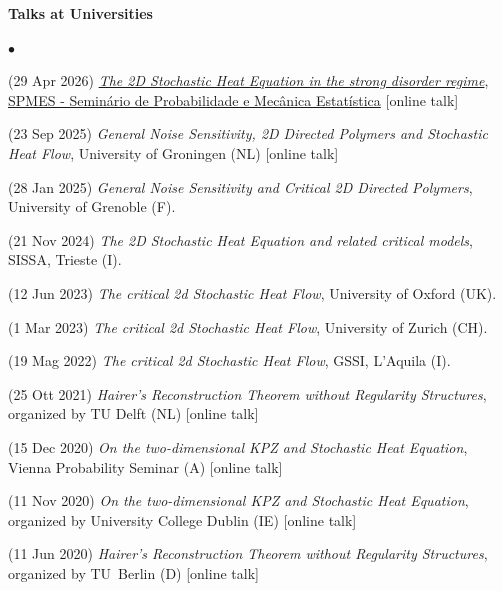 \documentclass[a4paper,11pt,oneside]{amsart}
\newenvironment{myitemize}{%
\begin{list}{$\bullet$}%
 	{%
	\setlength{\itemsep}{0.3em}%
	\setlength{\topsep}{0.3em}%
	\setlength{\partopsep}{0em}%
	\setlength{\parsep}{0em}%
	\setlength{\parskip}{0em}%
	\setlength\leftmargin{1.5em}%
	\setlength\labelwidth{1.1em}%
	\setlength{\labelsep}{0.4em}%
	}%
	}%
{\end{list}}
\renewenvironment{itemize}{
\begin{myitemize}}%
{\end{myitemize}}
\begin{document}

\medskip
{\large\sf \bfseries Talks at Universities}
\smallskip

\begin{itemize}
\item (29 Apr 2026)
\href{https://www.youtube.com/watch?v=Sr_MR2VmlfI}{\emph{The 2D Stochastic Heat Equation in the strong disorder regime}},
\href{https://spmes.impa.br/}{SPMES - Seminário de Probabilidade e Mecânica Estatística} [online talk]

\item (23 Sep 2025)
\emph{General Noise Sensitivity, 2D Directed Polymers and Stochastic Heat Flow},
University of Groningen (NL) [online talk]

\item (28 Jan 2025)
\emph{General Noise Sensitivity and Critical 2D Directed Polymers},
University of Grenoble (F).

\item (21 Nov 2024)
\emph{The 2D Stochastic Heat Equation and related critical models},
SISSA, Trieste (I).

\item (12 Jun 2023)
\emph{The critical 2d Stochastic Heat Flow},
University of Oxford (UK).

\item (1 Mar 2023)
\emph{The critical 2d Stochastic Heat Flow},
University of Zurich (CH).

\item (19 Mag 2022)
\emph{The critical 2d Stochastic Heat Flow},
GSSI, L'Aquila (I).

\item (25 Ott 2021)
\emph{Hairer's Reconstruction Theorem without Regularity Structures},
organized by TU Delft (NL) [online talk]

\item (15 Dec 2020)
\emph{On the two-dimensional KPZ and Stochastic Heat Equation},
Vienna Probability Seminar (A) [online talk]

\item (11 Nov 2020)
\emph{On the two-dimensional KPZ and Stochastic Heat Equation},
organized by University College Dublin (IE) [online talk]

\item (11 Jun 2020)
\emph{Hairer's Reconstruction Theorem without Regularity Structures},
organized by TU~Berlin (D) [online talk]


\end{itemize}
\end{document}
